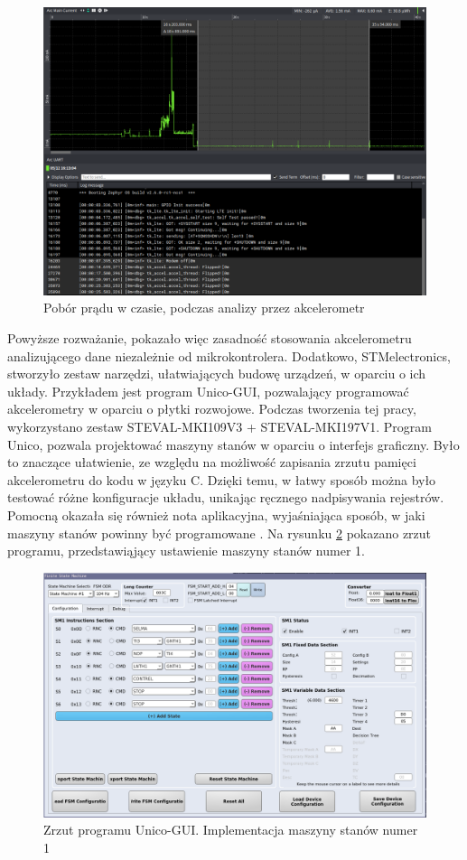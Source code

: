 \begin{figure}[h]
    \centering
    \includegraphics[width=15cm]{Graphics/recognize_acc.png}
    \caption{Pobór prądu w czasie, podczas analizy przez akcelerometr}
    \label{img:recognize_acc}
\end{figure}
Powyższe rozważanie, pokazało więc zasadność stosowania akcelerometru analizującego dane niezależnie od mikrokontrolera. Dodatkowo, STMelectronics, stworzyło zestaw narzędzi, ułatwiających budowę urządzeń, w oparciu o ich układy. Przykładem jest program Unico-GUI\cite{unico}, pozwalający programować akcelerometry w oparciu o płytki rozwojowe. Podczas tworzenia tej pracy, wykorzystano zestaw STEVAL-MKI109V3 + STEVAL-MKI197V1. Program Unico, pozwala projektować maszyny stanów w oparciu o interfejs graficzny. Było to znaczące ułatwienie, ze względu na możliwość zapisania zrzutu pamięci akcelerometru do kodu w języku C. Dzięki temu, w łatwy sposób można było testować różne konfiguracje układu, unikając ręcznego nadpisywania rejestrów. Pomocną okazała się również nota aplikacyjna, wyjaśniająca sposób, w jaki maszyny stanów powinny być programowane \cite{lsm6dsoxappnote}. Na rysunku \ref{img:unico_ss} pokazano zrzut programu, przedstawiąjący ustawienie maszyny stanów numer 1.
\begin{figure}[h]
    \centering
    \includegraphics[width=12cm]{Graphics/unico_screenshot.png}
    \caption{Zrzut programu Unico-GUI. Implementacja maszyny stanów numer 1}
    \label{img:unico_ss}
\end{figure}

